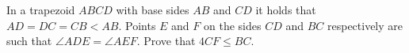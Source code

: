 \problem
In a trapezoid $ABCD$ with base sides $AB$ and $CD$ it holds that
$AD = DC = CB < AB$.
Points $E$ and $F$ on the sides $CD$ and $BC$ respectively are such that
$\angle ADE = \angle AEF$.
Prove that $4 CF \leq BC$.
\solution
\endproblem
